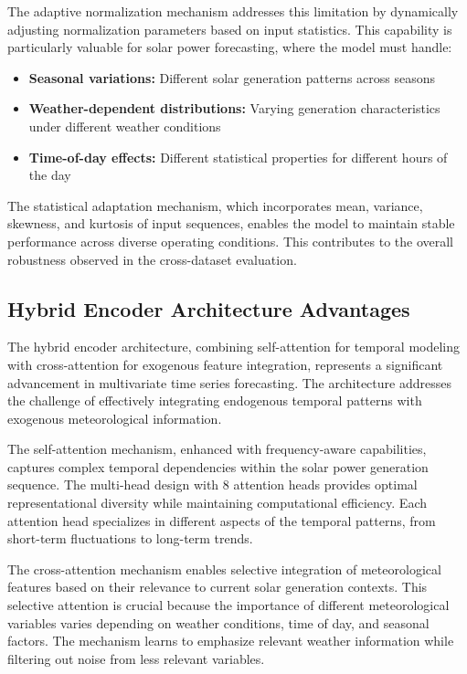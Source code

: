 \documentclass[12pt]{uomthesis}
\begin{document}
The adaptive normalization mechanism addresses this limitation by dynamically adjusting normalization parameters based on input statistics. This capability is particularly valuable for solar power forecasting, where the model must handle:
\begin{itemize}
\item \textbf{Seasonal variations:} Different solar generation patterns across seasons
\item \textbf{Weather-dependent distributions:} Varying generation characteristics under different weather conditions
\item \textbf{Time-of-day effects:} Different statistical properties for different hours of the day
\end{itemize}

The statistical adaptation mechanism, which incorporates mean, variance, skewness, and kurtosis of input sequences, enables the model to maintain stable performance across diverse operating conditions. This contributes to the overall robustness observed in the cross-dataset evaluation.

\subsection{Hybrid Encoder Architecture Advantages}

The hybrid encoder architecture, combining self-attention for temporal modeling with cross-attention for exogenous feature integration, represents a significant advancement in multivariate time series forecasting. The architecture addresses the challenge of effectively integrating endogenous temporal patterns with exogenous meteorological information.

The self-attention mechanism, enhanced with frequency-aware capabilities, captures complex temporal dependencies within the solar power generation sequence. The multi-head design with 8 attention heads provides optimal representational diversity while maintaining computational efficiency. Each attention head specializes in different aspects of the temporal patterns, from short-term fluctuations to long-term trends.

The cross-attention mechanism enables selective integration of meteorological features based on their relevance to current solar generation contexts. This selective attention is crucial because the importance of different meteorological variables varies depending on weather conditions, time of day, and seasonal factors. The mechanism learns to emphasize relevant weather information while filtering out noise from less relevant variables.
\end{document}
